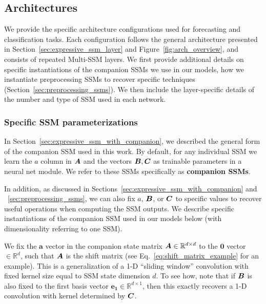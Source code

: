\subsection{\ourmethod{} Architectures}\label{appendix:architectures}

We provide the specific \ourmethod{} architecture configurations used for forecasting and classification tasks. Each configuration follows the general architecture presented in Section~\ref{sec:expressive_ssm_layer} and Figure~\ref{fig:arch_overview}, and consists of repeated Multi-SSM \ourmethod{} layers. We first provide additional details on specific instantiations of the companion SSMs we use in our models, \eg{} how we instantiate preprocessing SSMs to recover specific techniques (Section~\ref{sec:preprocessing_ssms}). We then include the layer-specific details of the number and type of SSM used in each network. 

\subsubsection{Specific SSM parameterizations}\label{appendix:specific_ssm_parameterizations}
In Section~\ref{sec:expressive_ssm_with_companion}, we described the general form of the companion SSM used in this work. By default, for any individual SSM we learn the $a$ column in $\boldsymbol{A}$ and the vectors $\boldsymbol{B}, \boldsymbol{C}$ as trainable parameters in a neural net module. We refer to these SSMs specifically as \textbf{companion SSMs}. 

In addition, as discussed in Sections~\ref{sec:expressive_ssm_with_companion} and ~\ref{sec:preprocessing_ssms}, we can also fix $a$, $\boldsymbol{B}$, or $\boldsymbol{C}$ to specific values to recover useful operations when computing the SSM outputs. We describe specific instantiations of the companion SSM used in our models below (with dimensionality referring to one SSM). 

We fix the $\boldsymbol{a}$ vector in the companion state matrix $\boldsymbol{A} \in \mathbb{R}^{d \times d}$ to the $\boldsymbol{0}$ vector $\in \mathbb{R}^d$, such that $\boldsymbol{A}$ is the shift matrix (see Eq.~\ref{eq:shift_matrix_example} for an example). This is a generalization of a 1-D ``sliding window'' convolution with fixed kernel size equal to SSM state dimension $d$. To see how, note that if $\boldsymbol{B}$ is also fixed to the first basis vector $\boldsymbol{e_1} \in \mathbb{R}^{d \times 1}$, then this exactly recovers a 1-D convolution with kernel determined by $\boldsymbol{C}$.

